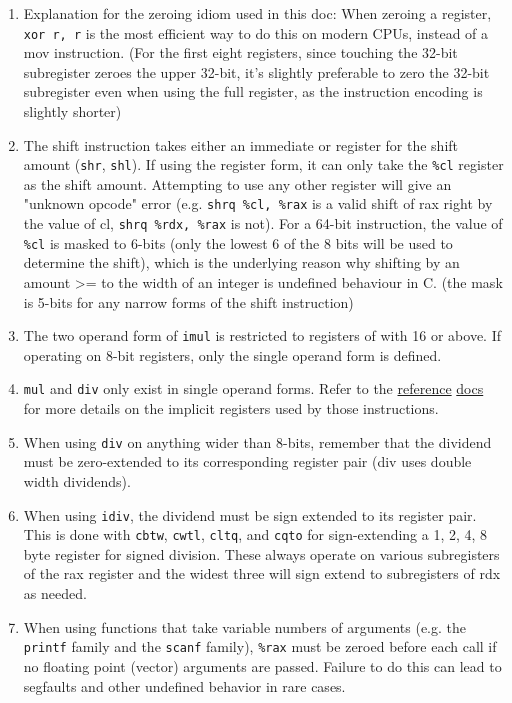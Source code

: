 \documentclass[11pt]{article}
\begin{document}
\begin{enumerate}
    \item Explanation for the zeroing idiom used in this doc: When zeroing a register,
        \texttt{xor r, r} is the most efficient way to do this on modern CPUs, instead of
        a mov instruction. (For the first eight registers, since touching the 32-bit
        subregister zeroes the upper 32-bit, it's slightly preferable to zero the 32-bit
        subregister even when using the full register, as the instruction encoding is
        slightly shorter)

    \item The shift instruction takes either an immediate or register for the shift amount
        (\texttt{shr}, \texttt{shl}). If using the register form, it can only take the
        \texttt{\%cl} register as the shift amount. Attempting to use any other register
        will give an "unknown opcode" error (e.g. \texttt{shrq \%cl, \%rax} is a valid
        shift of rax right by the value of cl, \texttt{shrq \%rdx, \%rax} is not). For a
        64-bit instruction, the value of \texttt{\%cl} is masked to 6-bits (only the
        lowest 6 of the 8 bits will be used to determine the shift), which is the
        underlying reason why shifting by an amount >= to the width of an integer is
        undefined behaviour in C. (the mask is 5-bits for any narrow forms of the shift
        instruction)

    \item The two operand form of \texttt{imul} is restricted to registers of with 16 or
        above. If operating on 8-bit registers, only the single operand form is defined.

    \item \texttt{mul} and \texttt{div} only exist in single operand forms. Refer to the
        \href{https://www.felixcloutier.com/x86/mul}{reference}
        \href{https://www.felixcloutier.com/x86/div}{docs} for more details on the
        implicit registers used by those instructions.

    \item When using \texttt{div} on anything wider than 8-bits, remember that the
        dividend must be zero-extended to its corresponding register pair (div uses
        double width dividends).

    \item When using \texttt{idiv}, the dividend must be sign extended to its register
        pair. This is done with \texttt{cbtw}, \texttt{cwtl}, \texttt{cltq}, and
        \texttt{cqto} for sign-extending a 1, 2, 4, 8 byte register for signed division.
        These always operate on various subregisters of the rax register and the widest
        three will sign extend to subregisters of rdx as needed.

    \item When using functions that take variable numbers of arguments (e.g. the
        \texttt{printf} family and the \texttt{scanf} family), \texttt{\%rax} must be
        zeroed before each call if no floating point (vector) arguments are passed.
        Failure to do this can lead to segfaults and other undefined behavior in rare
        cases.
\end{enumerate}
\end{document}
